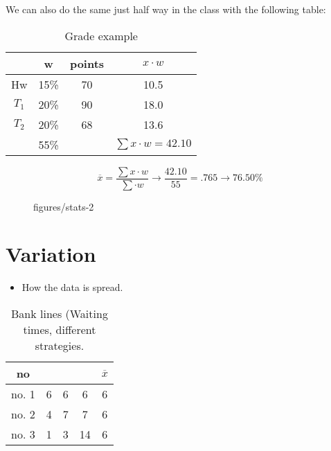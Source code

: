 We can also do the same just half way in the class with the following table:

\begin{table}[htbp]
    \centering
    \begin{tabular}{c|c|c|c}
        \toprule
          & w & points & $x\cdot w$ \\
          \midrule
        Hw & 15\% & 70 & 10.5 \\
        $T_1$ & 20\%    & 90 & 18.0 \\
        $T_2$ & 20\%    & 68 & 13.6 \\
        \midrule
              & 55\%      &    & $\sum x\cdot w = 42.10 $ \\
              \bottomrule
    \end{tabular}
    \caption{Grade example}
\end{table}
\[ \overline{x} = \frac{\sum x\cdot w}{\sum \cdot w} \to \frac{42.10}{55} = .765 \to 76.50\% \] 


\begin{figure}[ht]
    \centering
    \caption{figures/stats-2}
    \label{fig:stats-2}
\end{figure}

\vspace{50pt}


\section{Variation}

\begin{itemize}
    \item How the data is spread.
\end{itemize}

\begin{table}[htbp]
    \centering
    \begin{tabular}{c|| c|c|c|c}
        no  &   &   &   & $\overline{x}$\\
        \toprule
        no. 1 & 6 & 6 & 6  & 6 \\
        no. 2 & 4 & 7 & 7  & 6 \\
        no. 3 & 1 & 3 & 14 & 6 \\
        \bottomrule
    \end{tabular}
    \caption{Bank lines (Waiting times, different strategies.}
\end{table}

